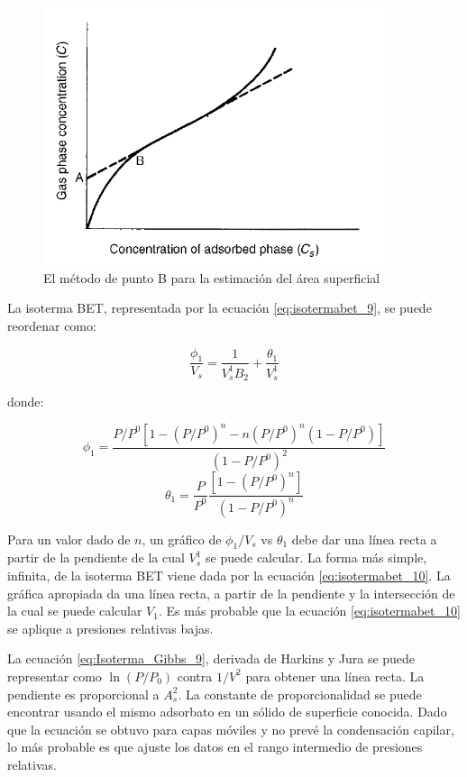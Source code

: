 \documentclass[11pt]{book}
\begin{document}
\begin{figure}[H]
    \centering
    \includegraphics[width = 10cm]{img/adsorcion/PuntoB_AreaSuperficial.PNG}
    \caption{El método de punto B para la estimación del área superficial}
    \label{fig:Isoterma_PuntoB}
\end{figure}

La isoterma BET, representada por la ecuación \ref{eq:isotermabet_9}, se puede reordenar como:

\begin{equation}
    \frac{\phi_1}{V_s} = \frac{1}{V_s^1 B_2} + \frac{\theta_1}{V_s^1}
\end{equation}

donde:

\begin{equation*}
    \phi_1 = \frac{P/P^0 \left[ 1 - (P/P^0)^n - n(P/P^0)^n(1-P/P^0) \right]}{(1-P/P^0)^2}
\end{equation*}
\begin{equation*}
    \theta_1 = \frac{P}{P^0} \frac{\left[ 1- (P/P^0)^n \right]}{(1-P/P^0)^n}
\end{equation*}

Para un valor dado de $n$, un gráfico de $\phi_1/V_s$ vs $\theta_1$ debe dar una línea recta a partir de la pendiente de la cual $V_s^1$ se puede calcular. La forma más simple, infinita, de la isoterma BET viene dada por la ecuación \ref{eq:isotermabet_10}. La gráfica apropiada da una línea recta, a partir de la pendiente y la intersección de la cual se puede calcular $V_1$. Es más probable que la ecuación \ref{eq:isotermabet_10} se aplique a presiones relativas bajas.

La ecuación \ref{eq:Isoterma_Gibbs_9}, derivada de Harkins y Jura se puede representar como $\ln{(P/P_0)}$ contra $1/V^2$ para obtener una línea recta. La pendiente es proporcional a $A_s^2$. La constante de proporcionalidad se puede encontrar usando el mismo adsorbato en un sólido de superficie conocida. Dado que la ecuación se obtuvo para capas móviles y no prevé la condensación capilar, lo más probable es que ajuste los datos en el rango intermedio de presiones relativas.
\end{document}
